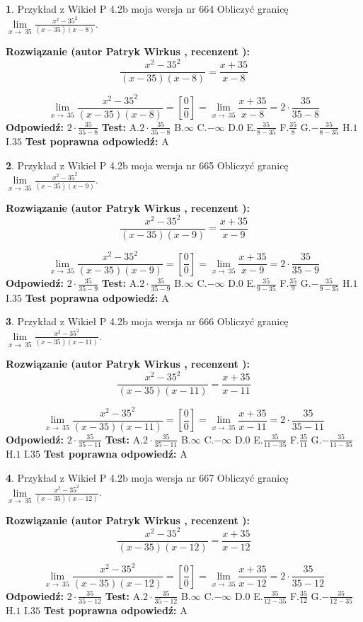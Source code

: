 \documentclass[12pt, a4paper]{article}
\theoremstyle{definition} %
\newtheorem{zad}{}
\newcommand{\zadStart}[1]{\begin{zad}#1\newline}
\newcommand{\zadStop}{\end{zad}}
\newcommand{\rozwStart}[2]{\noindent \textbf{Rozwiązanie (autor #1 , recenzent #2): }\newline}
\newcommand{\rozwStop}{\newline}
\newcommand{\odpStart}{\noindent \textbf{Odpowiedź:}\newline}
\newcommand{\odpStop}{\newline}
\newcommand{\testStart}{\noindent \textbf{Test:}\newline}
\newcommand{\testStop}{\newline}
\newcommand{\kluczStart}{\noindent \textbf{Test poprawna odpowiedź:}\newline}
\newcommand{\kluczStop}{\newline}
\begin{document}
\zadStart{Przykład z Wikieł P 4.2b moja wersja nr 664}
Obliczyć granicę $\lim\limits_{x\to\ 35}\frac{x^{2}-35^{2}}{(x-35)(x-8)}$.
\zadStop
\rozwStart{Patryk Wirkus}{}
$$\frac{x^{2}-35^{2}}{(x-35)(x-8)}=\frac{x+35}{x-8}$$

$$\lim\limits_{x\to\ 35}\frac{x^{2}-35^{2}}{(x-35)(x-8)}=[\frac{0}{0}]=\lim\limits_{x\to\ 35}\frac{x+35}{x-8}=2 \cdot \frac{35}{35-8}$$
\rozwStop
\odpStart
$2 \cdot \frac{35}{35-8}$
\odpStop
\testStart
A.$2 \cdot \frac{35}{35-8}$
B.$\infty$
C.$-\infty$
D.$0$
E.$\frac{35}{8-35}$
F.$\frac{35}{8}$
G.$-\frac{35}{8-35}$
H.$1$
I.$35$
\testStop
\kluczStart
A
\kluczStop



\zadStart{Przykład z Wikieł P 4.2b moja wersja nr 665}
Obliczyć granicę $\lim\limits_{x\to\ 35}\frac{x^{2}-35^{2}}{(x-35)(x-9)}$.
\zadStop
\rozwStart{Patryk Wirkus}{}
$$\frac{x^{2}-35^{2}}{(x-35)(x-9)}=\frac{x+35}{x-9}$$

$$\lim\limits_{x\to\ 35}\frac{x^{2}-35^{2}}{(x-35)(x-9)}=[\frac{0}{0}]=\lim\limits_{x\to\ 35}\frac{x+35}{x-9}=2 \cdot \frac{35}{35-9}$$
\rozwStop
\odpStart
$2 \cdot \frac{35}{35-9}$
\odpStop
\testStart
A.$2 \cdot \frac{35}{35-9}$
B.$\infty$
C.$-\infty$
D.$0$
E.$\frac{35}{9-35}$
F.$\frac{35}{9}$
G.$-\frac{35}{9-35}$
H.$1$
I.$35$
\testStop
\kluczStart
A
\kluczStop



\zadStart{Przykład z Wikieł P 4.2b moja wersja nr 666}
Obliczyć granicę $\lim\limits_{x\to\ 35}\frac{x^{2}-35^{2}}{(x-35)(x-11)}$.
\zadStop
\rozwStart{Patryk Wirkus}{}
$$\frac{x^{2}-35^{2}}{(x-35)(x-11)}=\frac{x+35}{x-11}$$

$$\lim\limits_{x\to\ 35}\frac{x^{2}-35^{2}}{(x-35)(x-11)}=[\frac{0}{0}]=\lim\limits_{x\to\ 35}\frac{x+35}{x-11}=2 \cdot \frac{35}{35-11}$$
\rozwStop
\odpStart
$2 \cdot \frac{35}{35-11}$
\odpStop
\testStart
A.$2 \cdot \frac{35}{35-11}$
B.$\infty$
C.$-\infty$
D.$0$
E.$\frac{35}{11-35}$
F.$\frac{35}{11}$
G.$-\frac{35}{11-35}$
H.$1$
I.$35$
\testStop
\kluczStart
A
\kluczStop



\zadStart{Przykład z Wikieł P 4.2b moja wersja nr 667}
Obliczyć granicę $\lim\limits_{x\to\ 35}\frac{x^{2}-35^{2}}{(x-35)(x-12)}$.
\zadStop
\rozwStart{Patryk Wirkus}{}
$$\frac{x^{2}-35^{2}}{(x-35)(x-12)}=\frac{x+35}{x-12}$$

$$\lim\limits_{x\to\ 35}\frac{x^{2}-35^{2}}{(x-35)(x-12)}=[\frac{0}{0}]=\lim\limits_{x\to\ 35}\frac{x+35}{x-12}=2 \cdot \frac{35}{35-12}$$
\rozwStop
\odpStart
$2 \cdot \frac{35}{35-12}$
\odpStop
\testStart
A.$2 \cdot \frac{35}{35-12}$
B.$\infty$
C.$-\infty$
D.$0$
E.$\frac{35}{12-35}$
F.$\frac{35}{12}$
G.$-\frac{35}{12-35}$
H.$1$
I.$35$
\testStop
\kluczStart
A
\kluczStop
\end{document}
